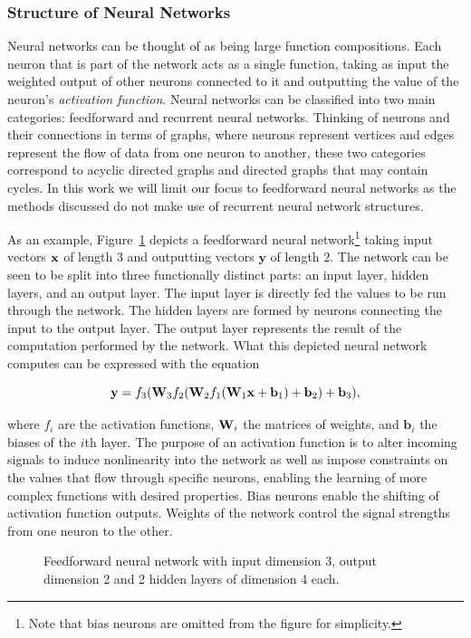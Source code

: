 \subsubsection{Structure of Neural Networks}

Neural networks can be thought of as being large function compositions. Each neuron that is part of the network acts as a single function, taking as input the weighted output of other neurons connected to it and outputting the value of the neuron's \textit{activation function}. Neural networks can be classified into two main categories: feedforward and recurrent neural networks. Thinking of neurons and their connections in terms of graphs, where neurons represent vertices and edges represent the flow of data from one neuron to another, these two categories correspond to acyclic directed graphs and directed graphs that may contain cycles. In this work we will limit our focus to feedforward neural networks as the methods discussed do not make use of recurrent neural network structures.

As an example, Figure~\ref{fig:nn} depicts a feedforward neural network\footnote{Note that bias neurons are omitted from the figure for simplicity.} taking input vectors $\mathbf{x}$ of length $3$ and outputting vectors $\mathbf{y}$ of length $2$. The network can be seen to be split into three functionally distinct parts: an input layer, hidden layers, and an output layer. The input layer is directly fed the values to be run through the network. The hidden layers are formed by neurons connecting the input to the output layer. The output layer represents the result of the computation performed by the network. What this depicted neural network computes can be expressed with the equation

$$\mathbf{y} = f_3(\mathbf{W}_3 f_2(\mathbf{W}_2 f_1(\mathbf{W}_1 \mathbf{x} + \mathbf{b}_1) + \mathbf{b}_2) + \mathbf{b}_3),$$

where $f_i$ are the activation functions, $\mathbf{W}_i$ the matrices of weights, and $\mathbf{b}_i$ the biases of the $i$th layer. The purpose of an activation function is to alter incoming signals to induce nonlinearity into the network as well as impose constraints on the values that flow through specific neurons, enabling the learning of more complex functions with desired properties. Bias neurons enable the shifting of activation function outputs. Weights of the network control the signal strengths from one neuron to the other.

\begin{figure}[!htb]
  \centering
  \resizebox{0.7\textwidth}{!}{\unskip}
  \caption{Feedforward neural network with input dimension 3, output dimension 2 and 2 hidden layers of dimension 4 each.}
  \label{fig:nn}
\end{figure}

